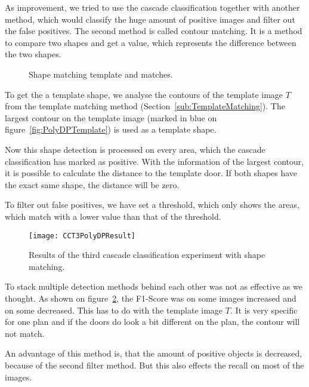 As improvement, we tried to use the cascade classification together with another method, which would classify the huge amount of positive images and filter out the false positives. The second method is called contour matching. It is a method to compare two shapes and get a value, which represents the difference between the two shapes.

\begin{figure}[h!]
	\centering
	\hfill
	\hfill
	\caption{Shape matching template and matches.}
	\label{fig:ShapeDistanceMatching}
\end{figure}

To get the a template shape, we analyse the contours of the template image $T$ from the template matching method (Section~\ref{sub:TemplateMatching}). The largest contour on the template image (marked in blue on figure~\ref{fig:PolyDPTemplate}) is used as a template shape.

Now this shape detection is processed on every area, which the cascade classification has marked as positive. With the information of the largest contour, it is possible to calculate the distance to the template door. If both shapes have the exact same shape, the distance will be zero.

To filter out false positives, we have set a threshold, which only shows the areas, which match with a lower value than that of the threshold.

\begin{figure}[H]
	\centering
	\texttt{[image: CCT3PolyDPResult]}
	\caption{Results of the third cascade classification experiment with shape matching.}
	\label{fig:CCT3PolyDPResult}
\end{figure}

To stack multiple detection methods behind each other was not as effective as we thought. As shown on figure~\ref{fig:CCT3PolyDPResult}, the F1-Score was on some images increased and on some decreased. This has to do with the template image $T$. It is very specific for one plan and if the doors do look a bit different on the plan, the contour will not match.

An advantage of this method is, that the amount of positive objects is decreased, because of the second filter method. But this also effects the recall on most of the images.

